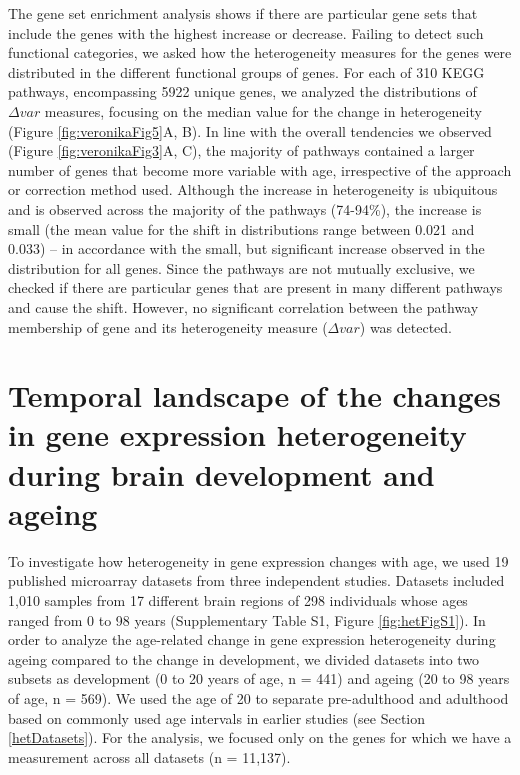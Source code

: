 \documentclass[12pt,twoside]{unicam}
\begin{document}
The gene set enrichment analysis shows if there are particular gene sets that include the genes with the highest increase or decrease. Failing to detect such functional categories, we asked how the heterogeneity measures for the genes were distributed in the different functional groups of genes. For each of 310 KEGG pathways, encompassing 5922 unique genes, we analyzed the distributions of \(\Delta var\) measures, focusing on the median value for the change in heterogeneity (Figure \ref{fig:veronikaFig5}A, B). In line with the overall tendencies we observed (Figure \ref{fig:veronikaFig3}A, C), the majority of pathways contained a larger number of genes that become more variable with age, irrespective of the approach or correction method used. Although the increase in heterogeneity is ubiquitous and is observed across the majority of the pathways (74-94\%), the increase is small (the mean value for the shift in distributions range between 0.021 and 0.033) -- in accordance with the small, but significant increase observed in the distribution for all genes. Since the pathways are not mutually exclusive, we checked if there are particular genes that are present in many different pathways and cause the shift. However, no significant correlation between the pathway membership of gene and its heterogeneity measure (\(\Delta var\)) was detected.

\hypertarget{ulasresults}{%
\section{Temporal landscape of the changes in gene expression heterogeneity during brain development and ageing}\label{ulasresults}}

To investigate how heterogeneity in gene expression changes with age, we used 19 published microarray datasets from three independent studies. Datasets included 1,010 samples from 17 different brain regions of 298 individuals whose ages ranged from 0 to 98 years (Supplementary Table S1, Figure \ref{fig:hetFigS1}). In order to analyze the age-related change in gene expression heterogeneity during ageing compared to the change in development, we divided datasets into two subsets as development (0 to 20 years of age, n = 441) and ageing (20 to 98 years of age, n = 569). We used the age of 20 to separate pre-adulthood and adulthood based on commonly used age intervals in earlier studies (see Section \ref{hetDatasets}). For the analysis, we focused only on the genes for which we have a measurement across all datasets (n = 11,137).
\end{document}
